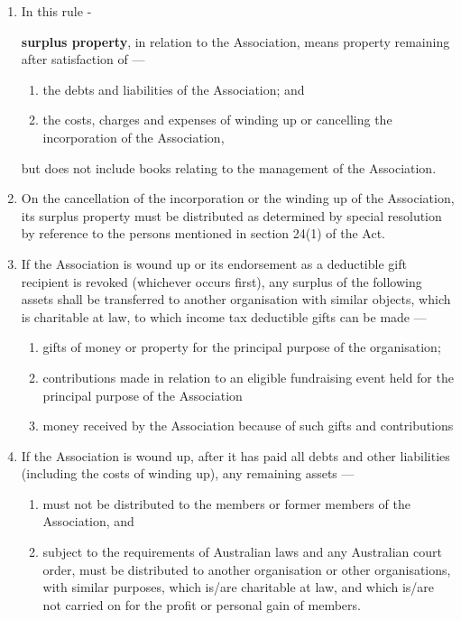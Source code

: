\documentclass[../constitution.tex]{subfiles}
\begin{document}
\begin{enumerate}

\item In this rule -

\textbf{surplus property}, in relation to the Association, means property remaining after satisfaction of ---

  \begin{enumerate}
  \item the debts and liabilities of the Association; and
  \item the costs, charges and expenses of winding up or cancelling the incorporation of the Association, 
  \end{enumerate}
  but does not include books relating to the management of the Association.
\item On the cancellation of the incorporation or the winding up of the Association, its surplus property must be distributed as determined by special resolution by reference to the persons mentioned in section 24(1) of the Act.

\item If the Association is wound up or its endorsement as a deductible gift recipient is revoked (whichever occurs first), any surplus of the following assets shall be transferred to another organisation with similar objects, which is charitable at law, to which income tax deductible gifts can be made ---
  \begin{enumerate}
  \item gifts of money or property for the principal purpose of the organisation;
  \item contributions made in relation to an eligible fundraising event held for the principal purpose of the Association
  \item money received by the Association because of such gifts and contributions
  \end{enumerate}
\item If the Association is wound up, after it has paid all debts and other liabilities (including the costs of winding up), any remaining assets ---
  \begin{enumerate}
    \item must not be distributed to the members or former members of the Association, and
    \item subject to the requirements of Australian laws and any Australian court order, must be distributed to another organisation or other organisations, with similar purposes, which is/are charitable at law, and which is/are not carried on for the profit or personal gain of members.
  \end{enumerate}
\end{enumerate}
\end{document}
